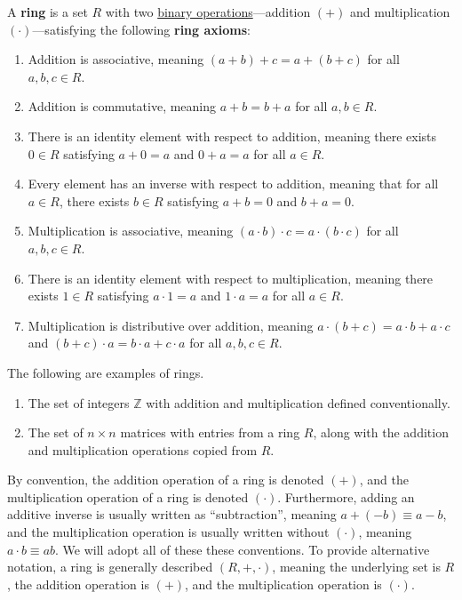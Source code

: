 \documentclass{scrartcl}
\begin{document}
\begin{definition}[Ring]
    \label{def:ring}
    \newcommand{\Z}{\mathbb{Z}}
    A \textbf{ring} is a set $R$ with two \hyperref[def:binary operation]{binary operations}---addition $(+)$ and
    multiplication $(\cdot)$---satisfying the following \textbf{ring axioms}:
    \begin{enumerate}
        \item Addition is associative, meaning $(a+b)+c=a+(b+c)$ for all $a,b,c\in R$.
        \item Addition is commutative, meaning $a+b=b+a$ for all $a,b\in R$.

        \item
            There is an identity element with respect to addition, meaning there exists $0\in R$ satisfying $a+0=a$ and
            $0+a=a$ for all $a\in R$.

        \item
            Every element has an inverse with respect to addition, meaning that for all $a\in R$, there exists $b\in R$
            satisfying $a+b=0$ and $b+a=0$.

        \item Multiplication is associative, meaning $(a\cdot b)\cdot c=a\cdot (b\cdot c)$ for all $a,b,c\in R$.

        \item
            There is an identity element with respect to multiplication, meaning there exists $1\in R$ satisfying
            $a\cdot 1=a$ and $1\cdot a=a$ for all $a\in R$.

        \item
            Multiplication is distributive over addition, meaning $a\cdot (b+c)=a\cdot b+a\cdot c$ and
            $(b+c)\cdot a=b\cdot a+c\cdot a$ for all $a,b,c\in R$.
    \end{enumerate}

    The following are examples of rings.
    \begin{enumerate}
        \item The set of integers $\Z$ with addition and multiplication defined conventionally.
        \item
            The set of $n\times n$ matrices with entries from a ring $R$, along with the addition and multiplication
            operations copied from $R$.
    \end{enumerate}
\end{definition}

By convention, the addition operation of a ring is denoted $(+)$, and the multiplication operation of a ring is denoted
$(\cdot)$.
Furthermore, adding an additive inverse is usually written as ``subtraction'', meaning $a+(-b)\equiv a-b$, and the
multiplication operation is usually written without $(\cdot)$, meaning $a\cdot b\equiv ab$.
We will adopt all of these these conventions.
To provide alternative notation, a ring is generally described $(R,+,\cdot)$, meaning the underlying set is $R$, the
addition operation is $(+)$, and the multiplication operation is $(\cdot)$.
\end{document}

